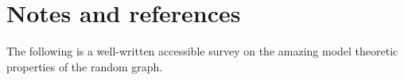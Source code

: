 \documentclass[creche.tex]{subfiles}
\begin{document}
\section{Notes and references}

The following is a well-written accessible survey on the amazing model theoretic properties of the random graph.

\begin{biblist}[]\normalsize
\end{biblist}
\end{document}
